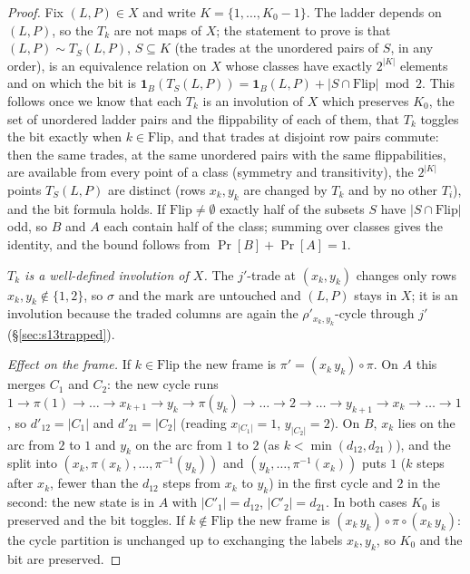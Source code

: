 \begin{proof}
Fix $(L,P)\in X$ and write $K=\{1,\dots,K_0-1\}$.  The ladder depends
on $(L,P)$, so the $T_k$ are not maps of $X$; the statement to prove is
that $(L,P)\sim T_S(L,P)$, $S\subseteq K$ (the trades at the
unordered pairs of $S$, in any order), is an equivalence relation on
$X$ whose classes have exactly $2^{|K|}$ elements and on which the bit
is $\mathbf 1_B(T_S(L,P))=\mathbf 1_B(L,P)+|S\cap\mathrm{Flip}|\bmod2$.
This follows once we know that each $T_k$ is an involution of $X$
which preserves $K_0$, the set of unordered ladder pairs and the
flippability of each of them, that $T_k$ toggles the bit exactly when
$k\in\mathrm{Flip}$, and that trades at disjoint row pairs commute:
then the same trades, at the same unordered pairs with the same
flippabilities, are available from every point of a class (symmetry
and transitivity), the $2^{|K|}$ points $T_S(L,P)$ are distinct
(rows $x_k,y_k$ are changed by $T_k$ and by no other $T_i$), and the
bit formula holds.  If $\mathrm{Flip}\ne\emptyset$ exactly half of the
subsets $S$ have $|S\cap\mathrm{Flip}|$ odd, so $B$ and $A$ each
contain half of the class; summing over classes gives the identity,
and the bound follows from $\Pr[B]+\Pr[A]=1$.

\emph{$T_k$ is a well-defined involution of $X$.}  The $j'$-trade at
$(x_k,y_k)$ changes only rows $x_k,y_k\notin\{1,2\}$, so $\sigma$ and
the mark are untouched and $(L,P)$ stays in $X$; it is an involution
because the traded columns are again the $\rho'_{x_k,y_k}$-cycle
through $j'$ (\S\ref{sec:s13trapped}).

\emph{Effect on the frame.}  If $k\in\mathrm{Flip}$ the new frame is
$\pi'=(x_k\,y_k)\circ\pi$.  On $A$ this merges $C_1$ and $C_2$: the
new cycle runs $1\to\pi(1)\to\dots\to x_{k+1}\to y_k\to\pi(y_k)\to\dots
\to2\to\dots\to y_{k+1}\to x_k\to\dots\to1$, so $d'_{12}=|C_1|$ and
$d'_{21}=|C_2|$ (reading $x_{|C_1|}=1$, $y_{|C_2|}=2$).  On $B$,
$x_k$ lies on the arc from $2$ to $1$ and $y_k$ on the arc from $1$ to
$2$ (as $k<\min(d_{12},d_{21})$), and the split into
$(x_k,\pi(x_k),\dots,\pi^{-1}(y_k))$ and $(y_k,\dots,\pi^{-1}(x_k))$
puts $1$ ($k$ steps after $x_k$, fewer than the $d_{12}$ steps from
$x_k$ to $y_k$) in the first cycle and $2$ in the second: the new
state is in $A$ with $|C'_1|=d_{12}$, $|C'_2|=d_{21}$.  In both cases
$K_0$ is preserved and the bit toggles.  If $k\notin\mathrm{Flip}$ the
new frame is $(x_k\,y_k)\circ\pi\circ(x_k\,y_k)$: the cycle partition
is unchanged up to exchanging the labels $x_k,y_k$, so $K_0$ and the
bit are preserved.


\end{proof}
